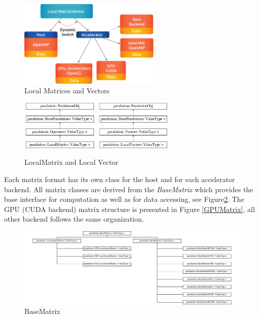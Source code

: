 \begin{figure}[!ht]
\centering
\includegraphics[width=0.6\textwidth]{./fig/local_obj.pdf}
\caption{Local Matrices and Vectors}
\label{paralution-local}
\end{figure}

\begin{figure}[!ht]
\centering
\includegraphics[width=0.33\textwidth]{./fig/body/classparalution_1_1_local_matrix.pdf}
\hspace{7mm}
\includegraphics[width=0.33\textwidth]{./fig/body/classparalution_1_1_local_vector.pdf}
\caption{LocalMatrix and Local Vector}
\end{figure}

Each matrix format has its own class for the host and for each accelerator backend. All matrix classes are derived from the \emph{BaseMatrix} which provides the base interface for computation as well as for data accessing, see Figure\ref{BaseMatrix}. The GPU (CUDA backend) matrix structure is presented in Figure \ref{GPUMatrix}, all other backend follows the same organization.

\begin{figure}[!ht]
\centering
\includegraphics[width=1.0\textwidth]{./fig/body/classparalution_1_1_base_matrix.pdf}
\caption{BaseMatrix}
\label{BaseMatrix}
\end{figure}

